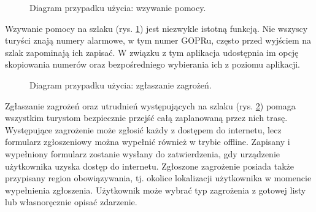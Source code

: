     \setlength{\fboxrule}{0.5pt}
    \begin{figure}[H]
        \centering
        \caption{Diagram przypadku użycia: wzywanie pomocy.}
        \label{ucd:pomoc}
    \end{figure}
    Wzywanie pomocy na szlaku (rys. \ref{ucd:pomoc}) jest niezwykle istotną funkcją. Nie wszyscy turyści znają numery alarmowe, w tym numer GOPRu, często przed wyjściem na szlak zapominają ich zapisać. W związku z tym aplikacja udostępnia im opcję skopiowania numerów oraz bezpośredniego wybierania ich z poziomu aplikacji.

    \setlength{\fboxrule}{0.5pt}
    \begin{figure}[H]
        \centering
        \caption{Diagram przypadku użycia: zgłaszanie zagrożeń.}
        \label{ucd:zagrozenia}
    \end{figure}
    Zgłaszanie zagrożeń oraz utrudnień występujących na szlaku (rys. \ref{ucd:zagrozenia}) pomaga wszystkim turystom bezpiecznie przejść całą zaplanowaną przez nich trasę. Występujące zagrożenie może zgłosić każdy z dostępem do internetu, lecz formularz zgłoszeniowy można wypełnić również w trybie offline. Zapisany i wypełniony formularz zostanie wysłany do zatwierdzenia, gdy urządzenie użytkownika uzyska dostęp do internetu. Zgłoszone zagrożenie posiada także przypisany region obowiązywania, tj. okolice lokalizacji użytkownika w momencie wypełnienia zgłoszenia. Użytkownik może wybrać typ zagrożenia z gotowej listy lub własnoręcznie opisać zdarzenie.

